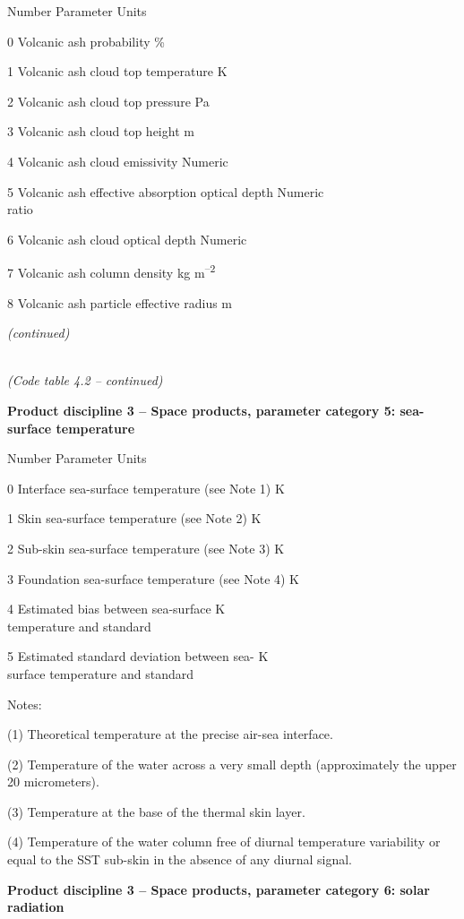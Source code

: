 Number Parameter Units

0 Volcanic ash probability \%

1 Volcanic ash cloud top temperature K

2 Volcanic ash cloud top pressure Pa

3 Volcanic ash cloud top height m

4 Volcanic ash cloud emissivity Numeric

5 Volcanic ash effective absorption optical depth Numeric\\
ratio

6 Volcanic ash cloud optical depth Numeric

7 Volcanic ash column density kg m\textsuperscript{--2}

8 Volcanic ash particle effective radius m

\emph{(continued)}

\emph{\\
(Code table 4.2 -- continued)}

\textbf{Product discipline 3 -- Space products, parameter category 5: sea-surface temperature}

Number Parameter Units

0 Interface sea-surface temperature (see Note 1) K

1 Skin sea-surface temperature (see Note 2) K

2 Sub-skin sea-surface temperature (see Note 3) K

3 Foundation sea-surface temperature (see Note 4) K

4 Estimated bias between sea-surface K\\
temperature and standard

5 Estimated standard deviation between sea- K\\
surface temperature and standard

Notes:

(1) Theoretical temperature at the precise air-sea interface.

(2) Temperature of the water across a very small depth (approximately the upper 20 micrometers).

(3) Temperature at the base of the thermal skin layer.

(4) Temperature of the water column free of diurnal temperature variability or equal to the SST sub-skin in the absence of any diurnal signal.

\textbf{Product discipline 3 -- Space products, parameter category 6: solar radiation}

